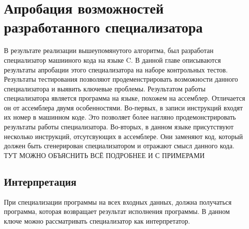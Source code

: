 \documentclass{spbau-diploma}
\begin{document}
\section{Апробация возможностей разработанного специализатора}
В результате реализации вышеупомянутого алгоритма, был разработан специализатор машииного кода на языке C. В данной главе описываются результаты апробации этого специализатора на наборе контрольных тестов. Результаты тестирования позволяют продеменстрировать возможности данного специализатора и выявить ключевые проблемы.
Результатом работы специализатора является программа на языке, похожем на ассемблер. Отличается он от ассемблера двумя особенностями. Во-первых, в записи инструкций входят их номер в машинном коде. Это позволяет более нагляно продемонстрировать результаты работы специализатора. Во-вторых, в данном языке присутствуют несколько инструкций, отсутсвующих в ассемблере. Они заменяют код, который должен быть сгенерирован специализатором и отражают смысл данного кода. {\Large ТУТ МОЖНО ОБЪЯСНИТЬ ВСЁ ПОДРОБНЕЕ И С ПРИМЕРАМИ}

\subsection{ Интерпретация}
При специализации программы на всех входных данных, должна получаться программа, которая возвращает результат исполнения программы. В данном ключе можно рассматривать специализатор как интерпретатор.
\end{document}
